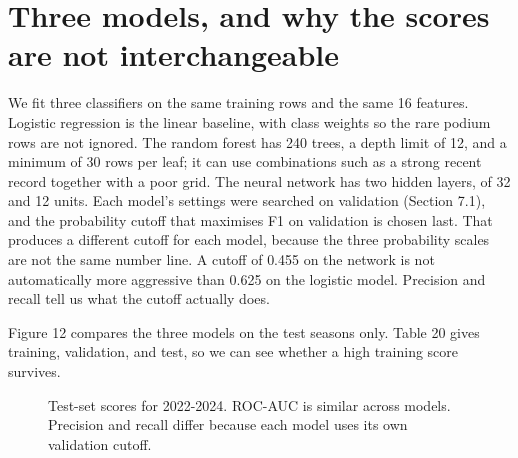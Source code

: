 \documentclass[10pt,a4paper]{article}
\begin{document}
\section{Three models, and why the scores are not interchangeable}


We fit three classifiers on the same training rows and the same 16 features. Logistic regression is the linear baseline, with class weights so the rare podium rows are not ignored. The random forest has 240 trees, a depth limit of 12, and a minimum of 30 rows per leaf; it can use combinations such as a strong recent record together with a poor grid. The neural network has two hidden layers, of 32 and 12 units. Each model's settings were searched on validation (Section 7.1), and the probability cutoff that maximises F1 on validation is chosen last. That produces a different cutoff for each model, because the three probability scales are not the same number line. A cutoff of 0.455 on the network is not automatically more aggressive than 0.625 on the logistic model. Precision and recall tell us what the cutoff actually does.


Figure 12 compares the three models on the test seasons only. Table 20 gives training, validation, and test, so we can see whether a high training score survives.


\begin{figure}[H]
\centering
{}
\caption{Test-set scores for 2022-2024. ROC-AUC is similar across models. Precision and recall differ because each model uses its own validation cutoff.}
\end{figure}
\end{document}

